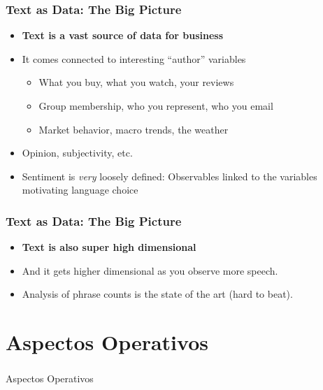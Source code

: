 \documentclass[
  shownotes,
  xcolor={svgnames},
  hyperref={colorlinks,citecolor=DarkBlue,linkcolor=DarkRed,urlcolor=DarkBlue}
  , aspectratio=169]{beamer}
\newcommand{\theme}{\color{andesred}}
\begin{document}
\begin{frame}[fragile]
\frametitle{Text as Data: The Big Picture}

\begin{itemize}


\item {\bf \theme Text is a vast source of data for business }
\medskip
\item It comes connected to interesting ``author'' variables 
\medskip
  \begin{itemize}
  \item What you buy, what you watch, your reviews
  \medskip
  \item Group membership, who you represent, who you email
  \medskip
  \item Market behavior, macro trends, the weather
  \end{itemize}

 
\item Opinion, subjectivity, etc.
\medskip
\item  Sentiment is {\it very} loosely defined:  Observables linked to the variables motivating language choice
\end{itemize}

\end{frame}
\begin{frame}[fragile]
\frametitle{Text as Data: The Big Picture}

\begin{itemize}

\item {\bf \theme Text is also super high dimensional }

\medskip
\item And it gets higher dimensional as you observe more speech.


\medskip
\item Analysis of  phrase counts is the state of the art (hard to beat).

\end{itemize}

\end{frame}

\section{Aspectos Operativos}
\begin{frame}[fragile]
\frametitle{}


\centering
{\huge \textcolor{andesred}{Aspectos Operativos}}


\end{frame}
\end{document}
